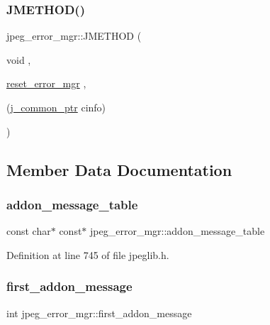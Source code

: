 \subsubsection{\texorpdfstring{JMETHOD()}{JMETHOD()}\hspace{0.1cm}{\footnotesize\ttfamily [5/5]}}
{\footnotesize\ttfamily jpeg\+\_\+error\+\_\+mgr\+::\+J\+M\+E\+T\+H\+OD (\begin{DoxyParamCaption}\item[{void}]{,  }\item[{\mbox{\hyperlink{jerror_8c_acd2c85048aefc02e56fc620974c5564b}{reset\+\_\+error\+\_\+mgr}}}]{,  }\item[{(\mbox{\hyperlink{jpeglib_8h_a1a177ab705cefea8f30ec31a48e62650}{j\+\_\+common\+\_\+ptr}} cinfo)}]{ }\end{DoxyParamCaption})}



\subsection{Member Data Documentation}
\mbox{\label{structjpeg__error__mgr_af327179ad6b8d663a173e25615257e33}} 
\subsubsection{\texorpdfstring{addon\_message\_table}{addon\_message\_table}}
{\footnotesize\ttfamily const char$\ast$ const$\ast$ jpeg\+\_\+error\+\_\+mgr\+::addon\+\_\+message\+\_\+table}



Definition at line 745 of file jpeglib.\+h.

\mbox{\label{structjpeg__error__mgr_a35a1536b1171bb13510b5156ffa0af05}} 
\subsubsection{\texorpdfstring{first\_addon\_message}{first\_addon\_message}}
{\footnotesize\ttfamily int jpeg\+\_\+error\+\_\+mgr\+::first\+\_\+addon\+\_\+message}



